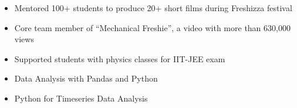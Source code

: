 \documentclass[10pt,a4paper,ragged2e,withhyper]{altacv}
\begin{document}
\begin{paracol}{2}

\label{sec:org22bf48b}

\begin{itemize}
\item Mentored 100+ students to produce 20+ short films during Freshizza festival
\item Core team member of ``Mechanical Freshie'', a video with more than 630,000 views
\item Supported students with physics classes for IIT-JEE exam
\end{itemize}

\label{sec:org77df3e7}

\begin{itemize}
\item Data Analysis with Pandas and Python
\item Python for Timeseries Data Analysis
\end{itemize}

\end{paracol}
\end{document}
